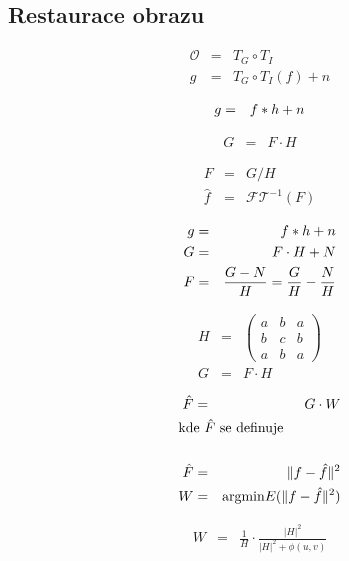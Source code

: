 \subsection{Restaurace obrazu}

\begin{eqnarray}
\mathcal{O}&=&T_G\circ T_I\\
g&=&T_G\circ T_I (f) +n
\end{eqnarray}


\begin{eqnarray}
g&=&f\ast h +n \label{eqv1}
\end{eqnarray}



\begin{eqnarray}
G&=&F\cdot H\label{eqv2}
\end{eqnarray}

\begin{eqnarray}
F&=&G/H\label{eqv3}\\
\hat{f}&=&\mathcal{FT}^{-1}(F)
\end{eqnarray}




\begin{eqnarray}
g&=&f \ast h+n\label{eqv4}\\
G&=&F\cdot H+N\label{eqv5}\\
F&=&\frac{G-N}{H}=\frac{G}{H}-\frac{N}{H}\label{eqv6}
\end{eqnarray}




\begin{eqnarray}
H&=&\left(\begin{array}{ccc}a&b&a\\b&c&b\\a&b&a\end{array}\right)\\
G&=&F\cdot H
\end{eqnarray}


\begin{eqnarray}
\hat{F}&=&G\cdot W\\
\noalign{\hbox{kde $\hat{F}$ se definuje}\nonumber}\\
\hat{F}&=&\|f-\hat{f}\|^2\\
W&=&\mathrm{argmin}E(\|f-\hat{f}\|^2)\label{minimalizace}
\end{eqnarray}


\begin{eqnarray}
W&=&\frac{1}{H}\cdot\frac{|H|^2}{|H|^2+\phi(u,v)}
\end{eqnarray}

